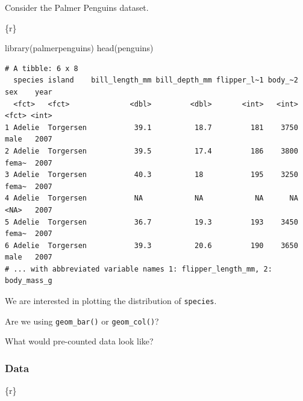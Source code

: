 \documentclass[
  letterpaper,
  DIV=11,
  numbers=noendperiod]{scrreprt}
\newenvironment{Shaded}{\begin{snugshade}}{\end{snugshade}}
\newcommand{\FunctionTok}[1]{\textcolor[rgb]{0.28,0.35,0.67}{#1}}
\newcommand{\InformationTok}[1]{\textcolor[rgb]{0.37,0.37,0.37}{#1}}
\newcommand{\NormalTok}[1]{\textcolor[rgb]{0.00,0.23,0.31}{#1}}
\begin{document}
\begin{tcolorbox}[enhanced jigsaw, breakable, colback=white, bottomrule=.15mm, leftrule=.75mm, colframe=quarto-callout-note-color-frame, arc=.35mm, rightrule=.15mm, toprule=.15mm, left=2mm, opacityback=0]

Consider the Palmer Penguins dataset.

\begin{Shaded}
\begin{Highlighting}[]
\InformationTok{\textasciigrave{}\textasciigrave{}\textasciigrave{}\{r\}}

\FunctionTok{library}\NormalTok{(palmerpenguins)}
\FunctionTok{head}\NormalTok{(penguins)}
\InformationTok{\textasciigrave{}\textasciigrave{}\textasciigrave{}}
\end{Highlighting}
\end{Shaded}

\begin{verbatim}
# A tibble: 6 x 8
  species island    bill_length_mm bill_depth_mm flipper_l~1 body_~2 sex    year
  <fct>   <fct>              <dbl>         <dbl>       <int>   <int> <fct> <int>
1 Adelie  Torgersen           39.1          18.7         181    3750 male   2007
2 Adelie  Torgersen           39.5          17.4         186    3800 fema~  2007
3 Adelie  Torgersen           40.3          18           195    3250 fema~  2007
4 Adelie  Torgersen           NA            NA            NA      NA <NA>   2007
5 Adelie  Torgersen           36.7          19.3         193    3450 fema~  2007
6 Adelie  Torgersen           39.3          20.6         190    3650 male   2007
# ... with abbreviated variable names 1: flipper_length_mm, 2: body_mass_g
\end{verbatim}

We are interested in plotting the distribution of \texttt{species}.

Are we using \texttt{geom\_bar()} or \texttt{geom\_col()}?

What would pre-counted data look like?

\hypertarget{data-3}{%
\subsubsection*{Data}\label{data-3}}

\begin{Shaded}
\begin{Highlighting}[]
\InformationTok{\textasciigrave{}\textasciigrave{}\textasciigrave{}\{r\}}


\end{Highlighting}
\end{Shaded}
\end{tcolorbox}
\end{document}
